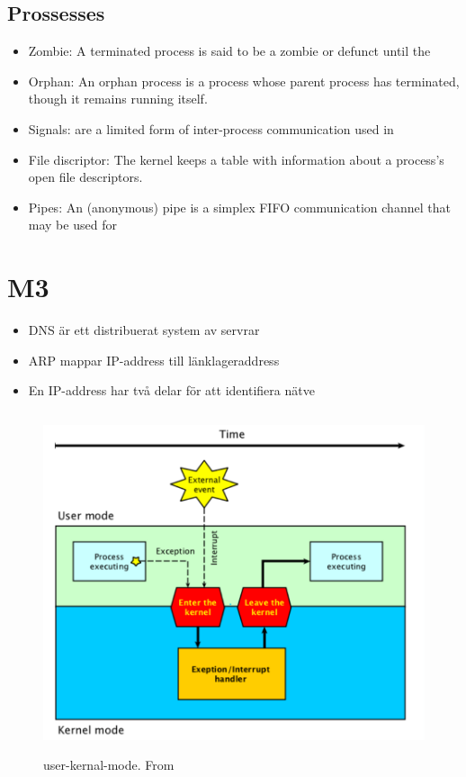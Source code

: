 \subsection{Prossesses}
\begin{itemize}
\item Zombie: A terminated process is said to be a zombie or defunct until the
\item Orphan: An orphan process is a process whose parent process has terminated, though it remains running itself.
\item Signals: are a limited form of inter-process communication used in
\item File discriptor: The kernel keeps a table with information about a process’s open file descriptors.
\item Pipes: An (anonymous) pipe is a simplex FIFO communication channel that may be used for
\end{itemize}

\section{M3}
\begin{itemize}
\item DNS är ett distribuerat system av servrar
\item ARP mappar IP-address till länklageraddress
\item En IP-address har två delar för att identifiera nätve
\end{itemize}

\begin{figure}[h]
    \vspace{10mm}
    \centering
    \includegraphics[width=14cm, height=10cm]{image/user-kernal-mode.png}
    \caption{user-kernal-mode. From \cite{}}
\end{figure}

